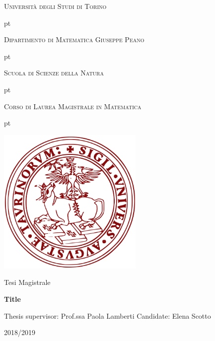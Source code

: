 \documentclass[a4paper,10 pt,titlepage,twoside]{book}
\theoremstyle{plain}
\theoremstyle{definition}
\theoremstyle{remark}
\begin{document}
\thispagestyle{empty}

\centerline {\huge{\textsc{Università degli Studi di Torino}}}
 pt

\centerline {\Large{\textsc{Dipartimento di Matematica Giuseppe Peano}}}

 pt

\centerline {\Large{\textsc{Scuola di Scienze della Natura}}}

 pt

\centerline {\Large{\textsc{Corso di Laurea Magistrale in Matematica}}}


 pt





\centerline {\includegraphics[width=7cm]{logo.jpg}}
\vskip 1.2cm
\centerline {\normalsize {Tesi Magistrale}} 

\vskip 0.7cm

\centerline {\Large {\bf Title}}

\vskip 1.7cm

\noindent Thesis supervisor: Prof.ssa Paola Lamberti
\hfill  {Candidate: Elena Scotto }\\





\vskip 2.7cm


\centerline{2018/2019}

\tableofcontents

% 
%
\end{document}
